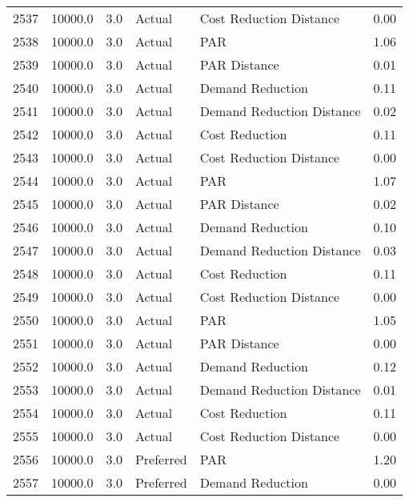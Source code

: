 \begin{longtable}{lrrllr}
2537 &      10000.0 &     3.0 &         Actual &    Cost Reduction Distance &   0.00 \\
2538 &      10000.0 &     3.0 &         Actual &                        PAR &   1.06 \\
2539 &      10000.0 &     3.0 &         Actual &               PAR Distance &   0.01 \\
2540 &      10000.0 &     3.0 &         Actual &           Demand Reduction &   0.11 \\
2541 &      10000.0 &     3.0 &         Actual &  Demand Reduction Distance &   0.02 \\
2542 &      10000.0 &     3.0 &         Actual &             Cost Reduction &   0.11 \\
2543 &      10000.0 &     3.0 &         Actual &    Cost Reduction Distance &   0.00 \\
2544 &      10000.0 &     3.0 &         Actual &                        PAR &   1.07 \\
2545 &      10000.0 &     3.0 &         Actual &               PAR Distance &   0.02 \\
2546 &      10000.0 &     3.0 &         Actual &           Demand Reduction &   0.10 \\
2547 &      10000.0 &     3.0 &         Actual &  Demand Reduction Distance &   0.03 \\
2548 &      10000.0 &     3.0 &         Actual &             Cost Reduction &   0.11 \\
2549 &      10000.0 &     3.0 &         Actual &    Cost Reduction Distance &   0.00 \\
2550 &      10000.0 &     3.0 &         Actual &                        PAR &   1.05 \\
2551 &      10000.0 &     3.0 &         Actual &               PAR Distance &   0.00 \\
2552 &      10000.0 &     3.0 &         Actual &           Demand Reduction &   0.12 \\
2553 &      10000.0 &     3.0 &         Actual &  Demand Reduction Distance &   0.01 \\
2554 &      10000.0 &     3.0 &         Actual &             Cost Reduction &   0.11 \\
2555 &      10000.0 &     3.0 &         Actual &    Cost Reduction Distance &   0.00 \\
2556 &      10000.0 &     3.0 &      Preferred &                        PAR &   1.20 \\
2557 &      10000.0 &     3.0 &      Preferred &           Demand Reduction &   0.00 \\

\end{longtable}
